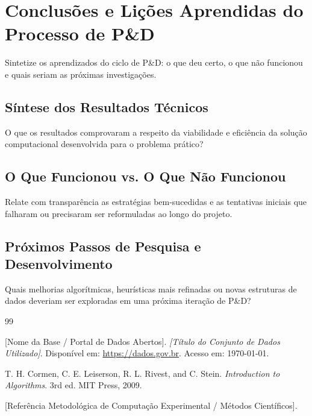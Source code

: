 \documentclass[11pt,a4paper]{article}
\begin{document}
\section{Conclusões e Lições Aprendidas do Processo de P\&D}

\begin{instrucao}
Sintetize os aprendizados do ciclo de P\&D: o que deu certo, o que não funcionou e quais seriam as próximas investigações.
\end{instrucao}

\subsection{Síntese dos Resultados Técnicos}
O que os resultados comprovaram a respeito da viabilidade e eficiência da solução computacional desenvolvida para o problema prático?

\subsection{O Que Funcionou vs. O Que Não Funcionou}
Relate com transparência as estratégias bem-sucedidas e as tentativas iniciais que falharam ou precisaram ser reformuladas ao longo do projeto.

\subsection{Próximos Passos de Pesquisa e Desenvolvimento}
Quais melhorias algorítmicas, heurísticas mais refinadas ou novas estruturas de dados deveriam ser exploradas em uma próxima iteração de P\&D?

\begin{thebibliography}{99}

[Nome da Base / Portal de Dados Abertos]. 
\textit{[Título do Conjunto de Dados Utilizado]}. Disponível em: \url{https://dados.gov.br}. Acesso em: \today.

T. H. Cormen, C. E. Leiserson, R. L. Rivest, and C. Stein. 
\textit{Introduction to Algorithms}. 3rd ed. MIT Press, 2009.

[Referência Metodológica de Computação Experimental / Métodos Científicos].

\end{thebibliography}
\end{document}
